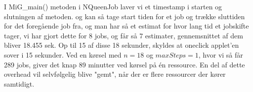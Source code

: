 I MiG\_main() metoden i NQueenJob laver vi et timestamp i starten og slutningen
af metoden.  og kan så tage start tiden for et job og trække sluttiden for det
foregående job fra, og man har så et estimat for hvor lang tid et jobskifte
tager, vi har gjort dette for 8 jobs, og får så 7 estimater, gennemsnittet af
dem bliver 18.455 sek.  Op til 15 af disse 18 sekunder, skyldes at oneclick
applet'en sover i 15 sekunder.  Ved en kørsel med $n=18$ og $maxSteps=1$, hvor
vi så får 289 jobs, giver det knap 89 minutter ved kørsel på én ressource. En del af dette overhead vil
selvfølgelig blive "gemt", når der er flere ressourcer der kører samtidigt.


